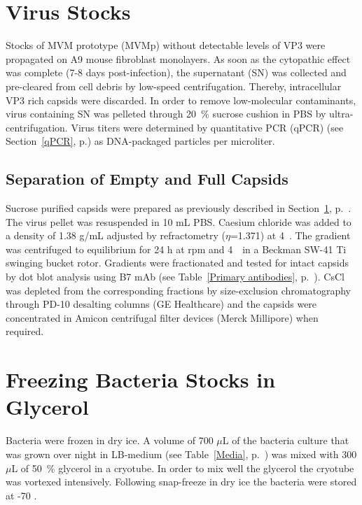 
\section{Virus Stocks}
\label{Virus Stocks}
Stocks of MVM prototype (MVMp) without detectable levels of VP3 were propagated on A9 mouse fibroblast monolayers. As soon as the cytopathic effect was complete (7-8 days post-infection), the supernatant (SN) was collected and pre-cleared from cell debris by low-speed centrifugation. Thereby, intracellular VP3 rich capsids were discarded. In order to remove low-molecular contaminants, virus containing SN was pelleted through 20~\% sucrose cushion in PBS by ultra-centrifugation. Virus titers were determined by quantitative PCR (qPCR) (see Section~\ref{qPCR}, p.\pageref{qPCR}) as DNA-packaged particles per microliter.   


\subsection{Separation of Empty and Full Capsids}
\label{CsCl}
Sucrose purified capsids were prepared as previously described in Section~\ref{Virus Stocks}, p.~\pageref{Virus Stocks}. The virus pellet was resuspended in 10 mL PBS. Caesium chloride was added to a density of 1.38 g/mL adjusted by refractometry ($\eta$=1.371) at 4~\textcelsius. The gradient was centrifuged to equilibrium for 24 h at  rpm and 4~\textcelsius~in a Beckman SW-41 Ti swinging bucket rotor. Gradients were fractionated and tested for intact capsids by dot blot analysis using B7 mAb (see Table~\ref{Primary antibodies}, p.~\pageref{Primary antibodies}). CsCl was depleted from the corresponding fractions by size-exclusion chromatography through PD-10 desalting columns (GE Healthcare) and the capsids were concentrated in Amicon\textsuperscript{\textregistered} centrifugal filter devices (Merck Millipore) when required.          
   
   


\section{Freezing Bacteria Stocks in Glycerol}
Bacteria were frozen in dry ice. A volume of 700 $\mu$L of the bacteria culture that was grown over night in LB-medium (see Table~\ref{Media}, p.~\pageref{Media}) was mixed with 300 $\mu$L of 50~\% glycerol in a cryotube. In order to mix well the glycerol the cryotube was vortexed intensively. Following snap-freeze in dry ice the bacteria were stored at -70 \textcelsius.


